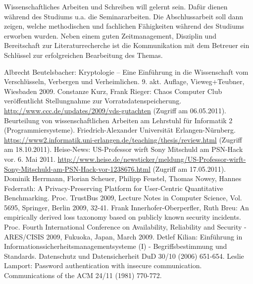 \documentclass[12pt]{scrartcl}
\begin{document}
Wissenschaftliches Arbeiten und Schreiben will gelernt sein. Dafür dienen während des Studiums u.a. die Seminararbeiten. Die Abschlussarbeit soll dann zeigen, welche methodischen und fachlichen Fähigkeiten während des Studiums erworben wurden. Neben einem guten Zeitmanagement, Disziplin und Bereitschaft zur Literaturrecherche ist die Kommunikation mit dem Betreuer ein Schlüssel zur erfolgreichen Bearbeitung des Themas. 

\newpage
{}
\begin{raggedright}%
\begin{thebibliography}{XXXXXXXX}
	 Albrecht Beutelsbacher: Kryptologie -- Eine Einführung in die Wissenschaft vom Verschlüsseln, Verbergen und Verheimlichen. 9. akt. Auflage, Vieweg+Teubner, Wiesbaden 2009.
	 Constanze Kurz, Frank Rieger: Chaos Computer Club veröffentlicht Stellungnahme zur Vorratsdatenspeicherung. \url{http://www.ccc.de/updates/2009/vds-gutachten} (Zugriff am 06.05.2011).
	 Beurteilung von wissenschaftlichen Arbeiten am Lehrstuhl für Informatik 2 (Programmiersysteme). Friedrich-Alexander Universität Erlangen-Nürnberg. \url{https://www2.informatik.uni-erlangen.de/teaching/thesis/review.html} (Zugriff am 18.10.2011).
	 Heise-News: US-Professor wirft Sony Mitschuld am PSN-Hack vor. 6. Mai 2011. \url{http://www.heise.de/newsticker/meldung/US-Professor-wirft-Sony-Mitschuld-am-PSN-Hack-vor-1238676.html} (Zugriff am 17.05.2011).
	 Dominik Herrmann, Florian Scheuer, Philipp Feustel, Thomas Nowey, Hannes Federrath: A Privacy-Preserving Platform for User-Centric Quantitative Benchmarking. Proc. TrustBus 2009, Lecture Notes in Computer Science, Vol. 5695, Springer, Berlin 2009, 32-41.
	 Frank Innerhofer-Oberperfler, Ruth Breu: An empirically derived loss taxonomy based on publicly known security incidents. Proc. Fourth International Conference on Availability, Reliability and Security - ARES/CISIS 2009, Fukuoka, Japan, March 2009.
	 Detlef Kilian: Einführung in Informationssicherheitsmanagementsysteme (I) - Begriffsbestimmung und Standards. Datenschutz und Datensicherheit DuD 30/10 (2006) 651-654.
	 Leslie Lamport: Password authentication with insecure communication. Communications of the ACM 24/11 (1981) 770-772.

\end{thebibliography}
\end{raggedright}
\end{document}
